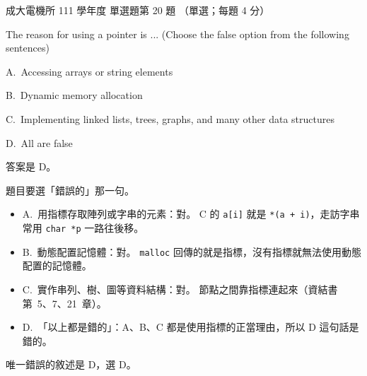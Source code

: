 \begin{pastexam}[label={px:ncku-111-ee-ds-20}]{成大電機所 111 學年度 單選題第 20 題}
（單選；每題 4 分）

The reason for using a pointer is ... \quad (Choose the false option from the following sentences)

A.~Accessing arrays or string elements

B.~Dynamic memory allocation

C.~Implementing linked lists, trees, graphs, and many other data structures

D.~All are false
\end{pastexam}

\begin{pastsoln}
答案是 D。

題目要選「錯誤的」那一句。
\begin{itemize}
\item A.~用指標存取陣列或字串的元素：對。 C 的 \texttt{a[i]} 就是 \texttt{*(a + i)}，走訪字串常用 \texttt{char *p} 一路往後移。
\item B.~動態配置記憶體：對。 \texttt{malloc} 回傳的就是指標，沒有指標就無法使用動態配置的記憶體。
\item C.~實作串列、樹、圖等資料結構：對。 節點之間靠指標連起來（資結書第~5、7、21~章）。
\item D.~「以上都是錯的」：A、B、C 都是使用指標的正當理由，所以 D 這句話是錯的。
\end{itemize}
唯一錯誤的敘述是 D，選 D。
\end{pastsoln}
